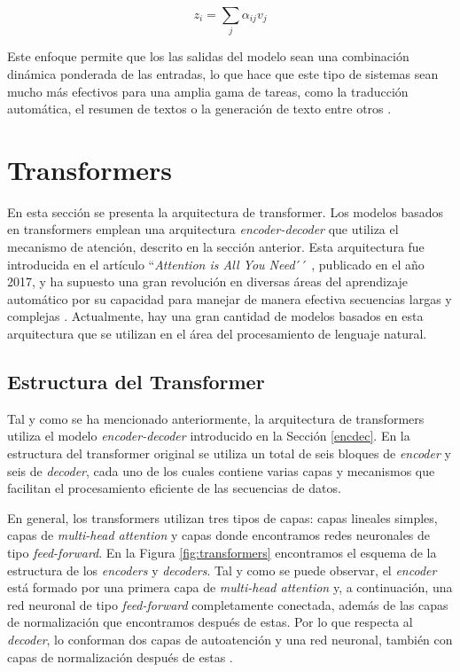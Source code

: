 \documentclass[11pt,spanish,listoffigures,listoftables]{tfgetsinf}
\begin{document}
\begin{equation}
z_i = \sum_j\alpha_{ij}v_j
\end{equation}

Este enfoque permite que los las salidas del modelo sean una combinación dinámica ponderada de las entradas, lo que hace que este tipo de sistemas sean mucho más efectivos para una amplia gama de tareas, como la traducción automática, el resumen de textos o la generación de texto entre otros \cite{murphy2022probabilistic, jurafsky2023speech}.

\section{Transformers} \label{transformers}

En esta sección se presenta la arquitectura de transformer. Los modelos basados en transformers emplean una arquitectura \textit{encoder-decoder} que utiliza el mecanismo de atención, descrito en la sección anterior. Esta arquitectura fue introducida en el artículo ``\textit{Attention is All You Need}´´ \cite{vaswani2023attentionneed}, publicado en el año 2017, y ha supuesto una gran revolución en diversas áreas del aprendizaje automático por su capacidad para manejar de manera efectiva secuencias largas y complejas \cite{dai2019transformerxlattentivelanguagemodels}. Actualmente, hay una gran cantidad de modelos basados en esta arquitectura que se utilizan en el área del procesamiento de lenguaje natural.

\subsection{Estructura del Transformer}

Tal y como se ha mencionado anteriormente, la arquitectura de transformers utiliza el modelo \textit{encoder-decoder} introducido en la Sección \ref{encdec}. En la estructura del transformer original se utiliza un total de seis bloques de \textit{encoder} y seis de \textit{decoder}, cada uno de los cuales contiene varias capas y mecanismos que facilitan el procesamiento eficiente de las secuencias de datos.

En general, los transformers utilizan tres tipos de capas: capas lineales simples, capas de \textit{multi-head attention} y capas donde encontramos redes neuronales de tipo \textit{feed-forward}. En la Figura \ref{fig:transformers} encontramos el esquema de la estructura de los \textit{encoders} y  \textit{decoders}. Tal y como se puede observar, el \textit{encoder} está formado por una primera capa de \textit{multi-head attention} y, a continuación, una red neuronal de tipo \textit{feed-forward} completamente conectada, además de las capas de normalización que encontramos después de estas. Por lo que respecta al \textit{decoder}, lo conforman dos capas de autoatención y una red neuronal, también con capas de normalización después de estas \cite{jurafsky2023speech, multiheaddotproduct}.
\end{document}
